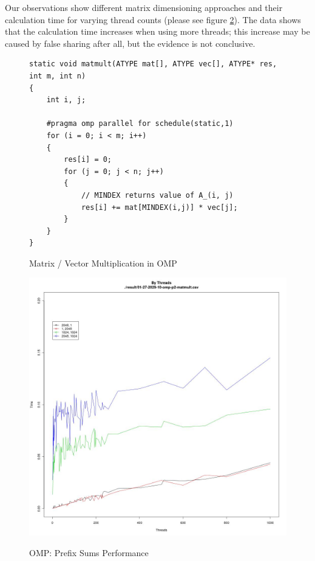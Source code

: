 \documentclass[12pt]{article}
\begin{document}
Our observations show different matrix dimensioning approaches and their calculation time for varying thread counts (please see figure \ref{omp_p2_graph}). The data shows that the calculation time increases when using more threads; this increase may be caused by false sharing after all, but the evidence is not conclusive.


\begin{figure}[H]
\caption{Matrix / Vector Multiplication in OMP}
\begin{lstlisting}
static void matmult(ATYPE mat[], ATYPE vec[], ATYPE* res, int m, int n)
{
	int i, j;

	#pragma omp parallel for schedule(static,1)
	for (i = 0; i < m; i++) 
	{
		res[i] = 0;
		for (j = 0; j < n; j++) 
		{
			// MINDEX returns value of A_(i, j)
			res[i] += mat[MINDEX(i,j)] * vec[j];
		}
	}
}
\end{lstlisting}
\label{omp_matmult_code}
\end{figure}

\begin{figure}[H]
\centering
\caption{OMP: Prefix Sums Performance}

\includegraphics[scale=0.3]{candidate-graphs/omp_p2_fixed_size_16.jpg}
\label{omp_p2_graph}
\end{figure}


\newpage
\end{document}
